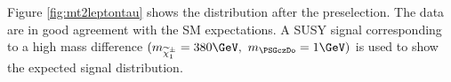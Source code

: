 


Figure \ref{fig:mt2leptontau}%
shows the \mttwo distribution after the preselection.
The data are in good agreement with the SM expectations. A SUSY signal corresponding to a high mass difference 
 $(m_{\chione}=380\GeV,~m_{\PSGczDo}=1\GeV)$ is used to show the expected signal distribution.

